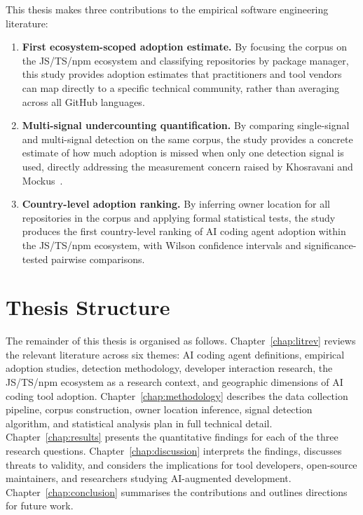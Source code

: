 This thesis makes three contributions to the empirical software engineering
literature:

\begin{enumerate}
  \item \textbf{First ecosystem-scoped adoption estimate.} By focusing the
    corpus on the JS/TS/npm ecosystem and classifying repositories by package
    manager, this study provides adoption estimates that practitioners and
    tool vendors can map directly to a specific technical community, rather
    than averaging across all GitHub languages.

  \item \textbf{Multi-signal undercounting quantification.} By comparing
    single-signal and multi-signal detection on the same corpus, the study
    provides a concrete estimate of how much adoption is missed when only
    one detection signal is used, directly addressing the measurement concern
    raised by Khosravani and Mockus~\cite{khosravani2026}.

  \item \textbf{Country-level adoption ranking.} By inferring owner location
    for all repositories in the corpus and applying formal statistical tests,
    the study produces the first country-level ranking of AI coding agent
    adoption within the JS/TS/npm ecosystem, with Wilson confidence intervals
    and significance-tested pairwise comparisons.
\end{enumerate}

\section{Thesis Structure}
\label{sec:intro:structure}

The remainder of this thesis is organised as follows.
Chapter~\ref{chap:litrev} reviews the relevant literature across six themes:
AI coding agent definitions, empirical adoption studies, detection methodology,
developer interaction research, the JS/TS/npm ecosystem as a research context,
and geographic dimensions of AI coding tool adoption.
Chapter~\ref{chap:methodology} describes the data collection pipeline, corpus
construction, owner location inference, signal detection algorithm, and
statistical analysis plan in full technical detail.
Chapter~\ref{chap:results} presents the quantitative findings for each of the
three research questions.
Chapter~\ref{chap:discussion} interprets the findings, discusses threats to
validity, and considers the implications for tool developers, open-source
maintainers, and researchers studying AI-augmented development.
Chapter~\ref{chap:conclusion} summarises the contributions and outlines
directions for future work.
